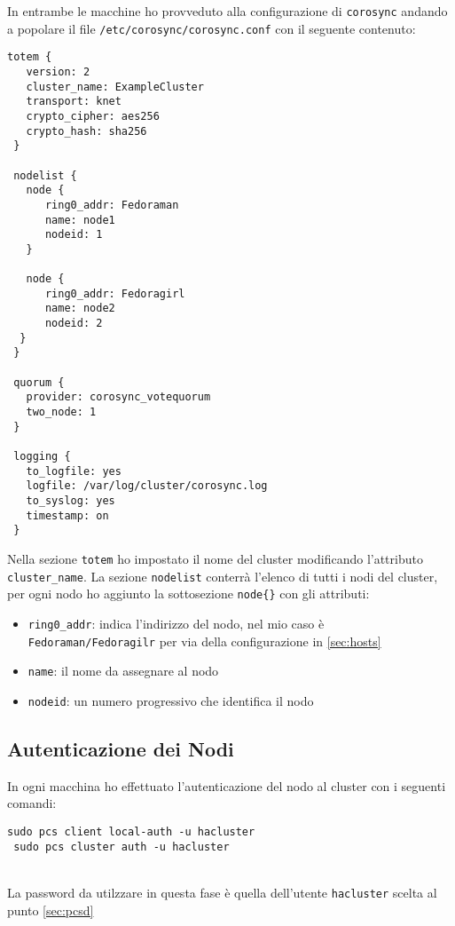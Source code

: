 In entrambe le macchine ho provveduto alla configurazione di \lstinline[style=cmd]|corosync| andando a popolare il file \lstinline[style=cmd]|/etc/corosync/corosync.conf| con il seguente contenuto:

\begin{lstlisting}[style=cmd]
 totem {
   version: 2
   cluster_name: ExampleCluster
   transport: knet
   crypto_cipher: aes256
   crypto_hash: sha256
 }

 nodelist {
   node {
      ring0_addr: Fedoraman
      name: node1
      nodeid: 1
   }
	
   node {
      ring0_addr: Fedoragirl
      name: node2
      nodeid: 2
  }
 }

 quorum {
   provider: corosync_votequorum
   two_node: 1
 }

 logging {
   to_logfile: yes
   logfile: /var/log/cluster/corosync.log
   to_syslog: yes
   timestamp: on
 }
\end{lstlisting}
\pagebreak
Nella sezione \lstinline[style=cmd]|totem| ho impostato il nome del cluster modificando l'attributo \lstinline[style=cmd]|cluster_name|. La sezione \lstinline[style=cmd]|nodelist| conterr\`{a} l'elenco di tutti i nodi del cluster, per ogni nodo ho aggiunto la sottosezione \lstinline[style=cmd]|node{}| con gli attributi:

\begin{itemize}
	\item \lstinline[style=cmd]|ring0_addr|: indica l'indirizzo del nodo, nel mio caso \`{e} \lstinline[style=cmd]|Fedoraman/Fedoragilr| per via della configurazione in \autoref{sec:hosts}
	\item \lstinline[style=cmd]|name|: il nome da assegnare al nodo
	\item \lstinline[style=cmd]|nodeid|: un numero progressivo che identifica il nodo
\end{itemize}

\subsection{Autenticazione dei Nodi}

In ogni macchina ho effettuato l'autenticazione del nodo al cluster con i seguenti comandi:

\begin{lstlisting}[style=cmd]
 sudo pcs client local-auth -u hacluster
 sudo pcs cluster auth -u hacluster
\end{lstlisting}
\ \\
La password da utilzzare in questa fase \`{e} quella dell'utente \lstinline[style=cmd]|hacluster| scelta al punto \autoref{sec:pcsd}

